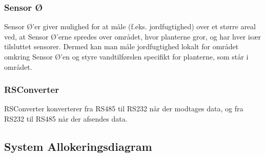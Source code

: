 \subsubsection{Sensor Ø}
Sensor Ø’er giver mulighed for at måle (f.eks. jordfugtighed) over et større areal ved, at Sensor Ø’erne spredes over området, hvor planterne gror, og har hver især tilsluttet sensorer. Dermed kan man måle jordfugtighed lokalt for området omkring Sensor Ø’en og styre vandtilførslen specifikt for planterne, som står i området.

\subsubsection{RSConverter}
RSConverter konverterer fra RS485 til RS232 når der modtages data, og fra RS232 til RS485 når der afsendes data.


\subsection{System Allokeringsdiagram}








